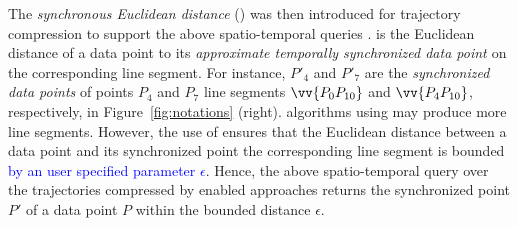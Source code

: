

The \emph{synchronous Euclidean distance} (\sed) was then introduced for trajectory compression to support the above spatio-temporal queries \cite{Meratnia:Spatiotemporal}. \sed is the Euclidean distance of a data point to its \emph{approximate temporally synchronized data point \cite{Meratnia:Spatiotemporal}} on the corresponding line segment. For instance, $P'_4$ and $P'_7$ are the \emph{synchronized data points} of points $P_4$ and $P_7$ \wrt line segments $\vv{P_0P_{10}}$ and $\vv{P_4P_{10}}$, respectively, in Figure~\ref{fig:notations} (right).
\lsa algorithms using \sed may produce more line segments. However, the use of \sed ensures that the Euclidean distance between a data point and its  synchronized point \wrt the corresponding line segment is bounded \textcolor{blue}{by an user specified parameter $\epsilon$}. Hence, the above spatio-temporal query over the trajectories compressed by \sed enabled approaches returns the synchronized point $P'$ of a data point $P$ within the bounded distance $\epsilon$.


